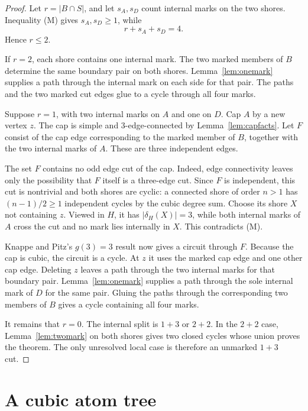 \documentclass[11pt]{article}
\theoremstyle{definition}
\theoremstyle{remark}
\newcommand{\cut}{\delta}
\begin{document}
\begin{proof}
Let \(r=|B\cap S|\), and let \(s_A,s_D\) count internal marks on the two
shores.  Inequality (M) gives \(s_A,s_D\ge1\), while
\[
 r+s_A+s_D=4.
\]
Hence \(r\le2\).

If \(r=2\), each shore contains one internal mark.  The two marked
members of \(B\) determine the same boundary pair on both shores.
Lemma~\ref{lem:onemark} supplies a path through the internal mark on
each side for that pair.  The paths and the two marked cut edges glue
to a cycle through all four marks.

Suppose \(r=1\), with two internal marks on \(A\) and one on \(D\).
Cap \(A\) by a new vertex \(z\).  The cap is simple and
\(3\)-edge-connected by Lemma~\ref{lem:capfacts}.  Let \(F\) consist of
the cap edge corresponding to the marked member of \(B\), together
with the two internal marks of \(A\).  These are three independent
edges.

The set \(F\) contains no odd edge cut of the cap.  Indeed, edge
connectivity leaves only the possibility that \(F\) itself is a
three-edge cut.  Since \(F\) is independent, this cut is nontrivial and
both shores are cyclic: a connected shore of order \(n>1\) has
\((n-1)/2\ge1\) independent cycles by the cubic degree sum.  Choose its
shore \(X\) not containing \(z\).
Viewed in \(H\), it has \(|\cut_H(X)|=3\), while both internal marks of
\(A\) cross the cut and no mark lies internally in \(X\).  This
contradicts (M).

Knappe and Pitz's \(g(3)=3\) result
\cite[Fact~5.4]{knappe2020} now gives a circuit through \(F\).
Because the cap is cubic, the circuit is a cycle.  At \(z\) it uses the
marked cap edge and one other cap edge.  Deleting \(z\) leaves a path
through the two internal marks for that boundary pair.
Lemma~\ref{lem:onemark} supplies a path through the sole internal mark
of \(D\) for the same pair.  Gluing the paths through the corresponding
two members of \(B\) gives a cycle containing all four marks.

It remains that \(r=0\).  The internal split is \(1+3\) or \(2+2\).  In
the \(2+2\) case, Lemma~\ref{lem:twomark} on both shores gives two
closed cycles whose union proves the theorem.  The only unresolved
local case is therefore an unmarked \(1+3\) cut.
\end{proof}

\section{A cubic atom tree}
\end{document}
